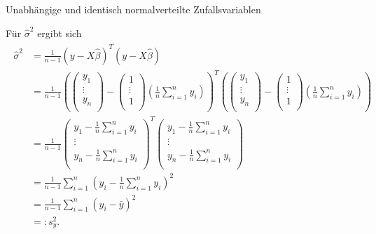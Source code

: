 \documentclass[
  8pt,
  ignorenonframetext,
]{beamer}
\begin{document}
\begin{frame}{Unabhängige und identisch normalverteilte
Zufallsvariablen}
\protect\hypertarget{unabhuxe4ngige-und-identisch-normalverteilte-zufallsvariablen-2}{}
\footnotesize

Für \(\hat{\sigma}^2\) ergibt sich \begin{align*}
\begin{split}
\hat{\sigma}^2
& = \frac{1}{n-1}\left(y-X\hat{\beta}\right)^T\left(y-X\hat{\beta} \right)
\\
& = \frac{1}{n-1}
\left(
\begin{pmatrix} y_1 \\  \vdots  \\  y_n \\  \end{pmatrix} -
\begin{pmatrix} 1       \\  \vdots  \\  1     \\    \end{pmatrix}
\left(\frac{1}{n}\sum_{i=1}^n y_i \right)
\right)^T
\left(
\begin{pmatrix} y_1 \\  \vdots  \\  y_n \\  \end{pmatrix} -
\begin{pmatrix} 1       \\  \vdots  \\  1     \\    \end{pmatrix}
\left(\frac{1}{n}\sum_{i=1}^n y_i \right)
\right)
\\
& =
\frac{1}{n-1}
\begin{pmatrix}
y_{1}-\frac{1}{n}\sum_{i=1}^n y_i \\
\vdots \\
y_{n}-\frac{1}{n}\sum_{i=1}^n y_i \\
\end{pmatrix}^T
\begin{pmatrix}
y_{1}-\frac{1}{n}\sum_{i=1}^n y_i \\
\vdots \\
y_{n}-\frac{1}{n}\sum_{i=1}^n y_i \\
\end{pmatrix}
\\
& = \frac{1}{n-1} \sum_{i=1}^n \left(y_i-\frac{1}{n} \sum_{i=1}^n y_i \right)^2
\\
& = \frac{1}{n-1}\sum_{i=1}^n \left(y_i-\bar{y} \right)^2
\\
& =: s^2_y.
\end{split}
\end{align*}
\end{frame}
\end{document}
